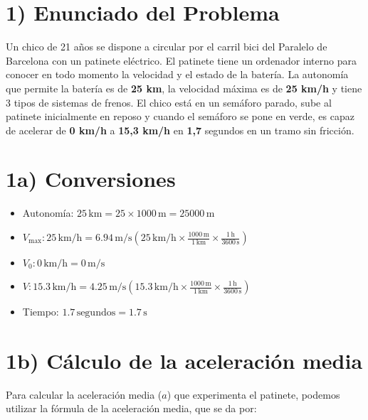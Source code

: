 \documentclass{article}
\begin{document}
\section*{1) Enunciado del Problema}

Un chico de 21 años se dispone a circular por el carril bici del Paralelo de Barcelona con un patinete eléctrico. El patinete tiene un ordenador interno para conocer en todo momento la velocidad y el estado de la batería. La autonomía que permite la batería es de \textbf{25 km}, la velocidad máxima es de \textbf{25 km/h} y tiene 3 tipos de sistemas de frenos. El chico está en un semáforo parado, sube al patinete inicialmente en reposo y cuando el semáforo se pone en verde, es capaz de acelerar de \textbf{0 km/h} a \textbf{15,3 km/h} en \textbf{1,7} segundos en un tramo sin fricción.


\section*{1a) Conversiones}

\begin{itemize}
    \item Autonomía: \(25 \, \text{km} = 25 \times 1000 \, \text{m} = 25000 \, \text{m}\)
    \item \(V_{\text{max}}: 25 \, \text{km/h} = 6.94 \, \text{m/s} \left( 25 \, \text{km/h} \times \frac{1000 \, \text{m}}{1 \, \text{km}} \times \frac{1 \, \text{h}}{3600 \, \text{s}} \right)\)
    \item \(V_0: 0 \, \text{km/h} = 0 \, \text{m/s}\)
    \item \(V: 15.3 \, \text{km/h} = 4.25 \, \text{m/s} \left( 15.3 \, \text{km/h} \times \frac{1000 \, \text{m}}{1 \, \text{km}} \times \frac{1 \, \text{h}}{3600 \, \text{s}} \right)\)
    \item Tiempo: \(1.7 \, \text{segundos} = 1.7 \, \text{s}\)
\end{itemize}







\section*{1b) Cálculo de la aceleración media}

Para calcular la aceleración media (\(a\)) que experimenta el patinete, podemos utilizar la fórmula de la aceleración media, que se da por:
\end{document}
